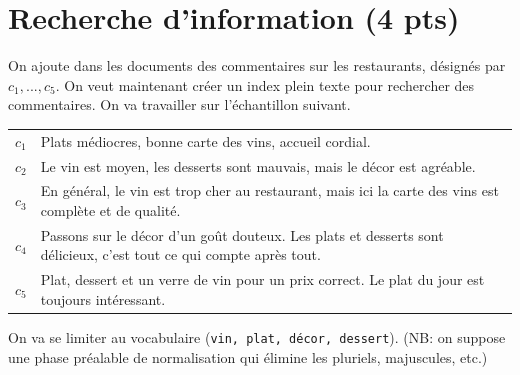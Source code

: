 \documentclass[10pt,a4paper]{article}
\begin{document}
\section{Recherche d'information (4 pts)}

On ajoute dans les  documents des commentaires sur les restaurants, désignés
par $c_1, ..., c_5$. On veut maintenant
créer un index plein texte pour rechercher des commentaires. On va travailler sur l'échantillon
suivant.

\vspace*{0.3cm}

\begin{tabular}{lp{15cm}}
     $c_1$& Plats médiocres, bonne carte des vins, accueil cordial.\\
     $c_2$& Le vin est moyen, les desserts sont mauvais, mais le décor est agréable.\\
     $c_3$& En général, le vin est trop cher au restaurant, mais ici la carte
         des vins est complète et de qualité.\\
     $c_4$& Passons sur le décor d'un goût douteux. Les plats et desserts sont délicieux,
          c'est tout ce qui compte après tout.\\
     $c_5$& Plat, dessert et un verre de vin pour un prix correct. Le plat du jour
             est toujours intéressant.\\ 
\end{tabular}

\bigskip

On va se limiter au vocabulaire (\texttt{vin, plat, décor, dessert}).
(NB: on suppose
     une phase préalable de normalisation qui élimine les pluriels, majuscules, etc.)
\end{document}
